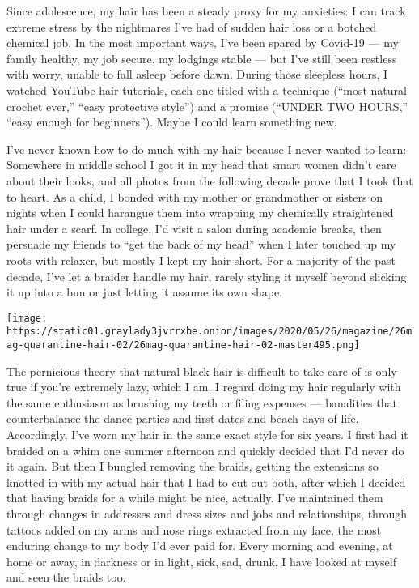 Since adolescence, my hair has been a steady proxy for my anxieties: I
can track extreme stress by the nightmares I've had of sudden hair loss
or a botched chemical job. In the most important ways, I've been spared
by Covid-19 --- my family healthy, my job secure, my lodgings stable ---
but I've still been restless with worry, unable to fall asleep before
dawn. During those sleepless hours, I watched YouTube hair tutorials,
each one titled with a technique (``most natural crochet ever,'' ``easy
protective style'') and a promise (``UNDER TWO HOURS,'' ``easy enough
for beginners''). Maybe I could learn something new.

I've never known how to do much with my hair because I never wanted to
learn: Somewhere in middle school I got it in my head that smart women
didn't care about their looks, and all photos from the following decade
prove that I took that to heart. As a child, I bonded with my mother or
grandmother or sisters on nights when I could harangue them into
wrapping my chemically straightened hair under a scarf. In college, I'd
visit a salon during academic breaks, then persuade my friends to ``get
the back of my head'' when I later touched up my roots with relaxer, but
mostly I kept my hair short. For a majority of the past decade, I've let
a braider handle my hair, rarely styling it myself beyond slicking it up
into a bun or just letting it assume its own shape.

\texttt{[image: https://static01.graylady3jvrrxbe.onion/images/2020/05/26/magazine/26mag-quarantine-hair-02/26mag-quarantine-hair-02-master495.png]}

The pernicious theory that natural black hair is difficult to take care
of is only true if you're extremely lazy, which I am. I regard doing my
hair regularly with the same enthusiasm as brushing my teeth or filing
expenses --- banalities that counterbalance the dance parties and first
dates and beach days of life. Accordingly, I've worn my hair in the same
exact style for six years. I first had it braided on a whim one summer
afternoon and quickly decided that I'd never do it again. But then I
bungled removing the braids, getting the extensions so knotted in with
my actual hair that I had to cut out both, after which I decided that
having braids for a while might be nice, actually. I've maintained them
through changes in addresses and dress sizes and jobs and relationships,
through tattoos added on my arms and nose rings extracted from my face,
the most enduring change to my body I'd ever paid for. Every morning and
evening, at home or away, in darkness or in light, sick, sad, drunk, I
have looked at myself and seen the braids too.

